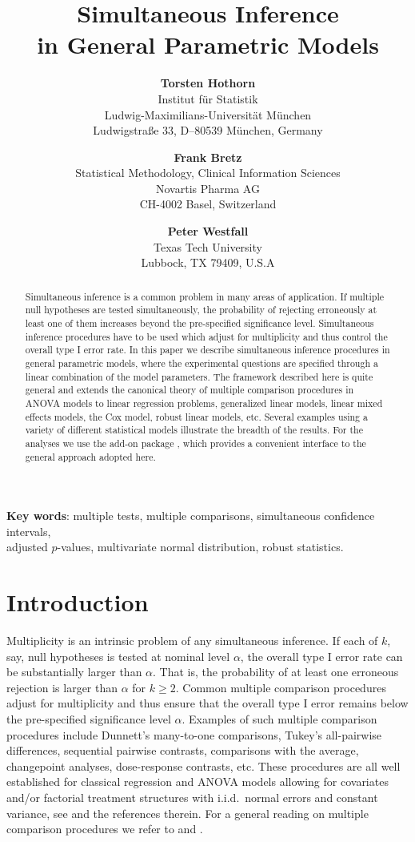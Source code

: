 \documentclass[12pt]{article}
\title{Simultaneous Inference \\ in General Parametric Models}
\author{\textbf{Torsten Hothorn} \\
Institut f{\"u}r Statistik \\
Ludwig-Maximilians-Universit{\"a}t M{\"u}nchen \\
Ludwigstra{\ss}e 33, D--80539 M{\"u}nchen, Germany\\
\and \textbf{Frank Bretz} \\
Statistical Methodology, Clinical Information Sciences\\
Novartis Pharma AG \\
CH-4002 Basel, Switzerland \\
\and \textbf{Peter Westfall} \\
Texas Tech University \\
Lubbock, TX 79409, U.S.A}
\begin{document}
\maketitle
\thispagestyle{empty}
\setcounter{page}{0}

\begin{abstract}
Simultaneous inference is a common problem in many
areas of application. If multiple null
hypotheses are tested simultaneously, the probability of rejecting
erroneously at least one of them increases beyond the pre-specified
significance level. Simultaneous inference procedures have to be used
which adjust for multiplicity and thus control the overall type I error
rate. In this paper we describe simultaneous
inference procedures in general parametric models, where the
experimental questions are specified through a linear
combination of the model parameters. The framework described here
is quite general and extends the canonical theory of multiple comparison procedures
in ANOVA models to linear regression problems, generalized linear models, linear mixed
effects models, the Cox model, robust linear models, etc.
Several examples using a variety of different statistical models
illustrate the breadth of the results. For the analyses we use the
\RR{} add-on package , which provides a convenient interface to
the general approach adopted here.

\end{abstract}

\textbf{Key words}: multiple tests, multiple comparisons, simultaneous
confidence intervals, \\
adjusted $p$-values, multivariate normal distribution, robust statistics.

\newpage

\section{Introduction}

Multiplicity is an intrinsic problem of any simultaneous inference.
If each of $k$, say, null hypotheses is tested at nominal level $\alpha$,
the overall type I error rate can be substantially larger than $\alpha$.
That is, the probability of at least one erroneous rejection is larger than $\alpha$ for
$k \geq 2$. Common multiple comparison procedures adjust for multiplicity and thus
ensure that the overall type I error remains below the pre-specified significance level $\alpha$.
Examples of such multiple comparison procedures include Dunnett's many-to-one comparisons,
Tukey's all-pairwise differences, sequential pairwise contrasts, comparisons with the
average, changepoint analyses, dose-response contrasts, etc. These procedures are
all well established for classical regression and ANOVA models allowing for covariates
and/or factorial treatment structures with i.i.d.~normal errors and constant
variance, see \cite{Bretzetal2008} and the references therein. For a general reading
on multiple comparison procedures we refer to
\cite{HochbergTamhane1987} and \cite{Hsu1996}.
\end{document}
